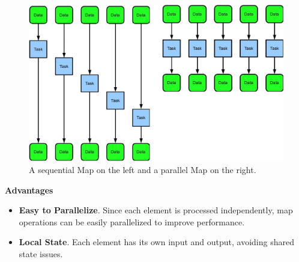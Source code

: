 \begin{figure}[!htp]
    \centering
    \includegraphics[width=\textwidth]{img/map-pattern-2.pdf}
    \caption{A sequential Map on the left and a parallel Map on the right.}
\end{figure}

\highspace
\begin{flushleft}
    \textcolor{Green3}{ \textbf{Advantages}}
\end{flushleft}
\begin{itemize}[label=\textcolor{Green3}{}]
    \item \textcolor{Green3}{\textbf{Easy to Parallelize}}. Since each element is processed independently, map operations can be easily parallelized to improve performance.

    \item \textcolor{Green3}{\textbf{Local State}}. Each element has its own input and output, avoiding shared state issues.
\end{itemize}
